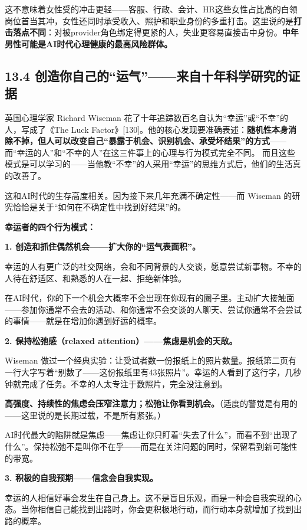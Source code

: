 \documentclass[11pt,a4paper]{ctexart}
\begin{document}
这不意味着女性受的冲击更轻——客服、行政、会计、HR这些女性占比高的白领岗位首当其冲，女性还同时承受收入、照护和职业身份的多重打击。这里说的是\textbf{打击落点不同}：对被provider角色绑定得更紧的人，失业更容易直接击中身份。\textbf{中年男性可能是AI时代心理健康的最高风险群体。}

\subsection{13.4 创造你自己的“运气”——来自十年科学研究的证据}

英国心理学家 Richard Wiseman 花了十年追踪数百名自认为“幸运”或“不幸”的人，写成了《The Luck Factor》[130]。他的核心发现要准确表述：\textbf{随机性本身消除不掉，但人可以改变自己“暴露于机会、识别机会、承受坏结果”的方式}——而“幸运的人”和“不幸的人”在这三件事上的心理与行为模式完全不同。 而且这些模式是可以学习的——当他教“不幸”的人采用“幸运”的思维方式后，他们的生活真的改善了。

这和AI时代的生存高度相关。因为接下来几年充满不确定性——而 Wiseman 的研究恰恰是关于“如何在不确定性中找到好结果”的。

\textbf{幸运者的四个行为模式：}

\textbf{1. 创造和抓住偶然机会——扩大你的“运气表面积”。}

幸运的人有更广泛的社交网络，会和不同背景的人交谈，愿意尝试新事物。不幸的人待在舒适区、和熟悉的人在一起、拒绝新体验。

在AI时代，你的下一个机会大概率不会出现在你现有的圈子里。主动扩大接触面——参加你通常不会去的活动、和你通常不会交谈的人聊天、尝试你通常不会尝试的事情——就是在增加你遇到好运的概率。

\textbf{2. 保持松弛感（relaxed attention）——焦虑是机会的天敌。}

Wiseman 做过一个经典实验：让受试者数一份报纸上的照片数量。报纸第二页有一行大字写着“别数了——这份报纸里有43张照片”。幸运的人看到了这行字，几秒钟就完成了任务。不幸的人太专注于数照片，完全没注意到。

\textbf{高强度、持续性的焦虑会压窄注意力；松弛让你看到机会。}（适度的警觉是有用的——这里说的是长期过载，不是所有紧张。）

AI时代最大的陷阱就是焦虑——焦虑让你只盯着“失去了什么”，而看不到“出现了什么”。保持松弛不是叫你不在乎——而是在关注问题的同时，保留看到新可能性的带宽。

\textbf{3. 积极的自我预期——信念会自我实现。}

幸运的人相信好事会发生在自己身上。这不是盲目乐观，而是一种会自我实现的心态。当你相信自己能找到出路时，你会更积极地行动，而行动本身就增加了找到出路的概率。
\end{document}
